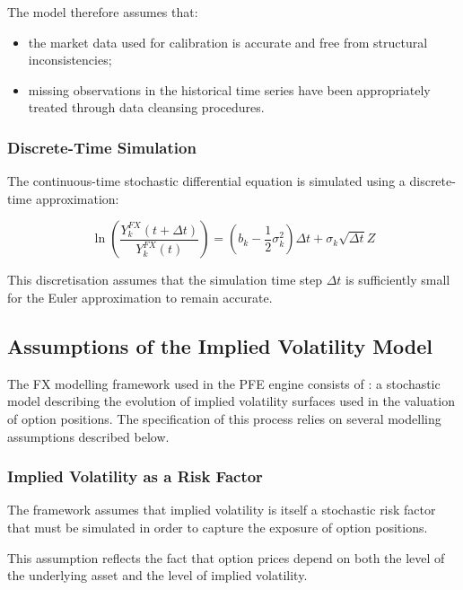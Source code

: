 The model therefore assumes that:

\begin{itemize}
	\item the market data used for calibration is accurate and free from structural inconsistencies;
	\item missing observations in the historical time series have been appropriately treated through data cleansing procedures.
\end{itemize}

\subsubsection{Discrete-Time Simulation}

The continuous-time stochastic differential equation is simulated using a discrete-time approximation:

\begin{equation}
	\ln
	\left(
	\frac{Y_k^{FX}(t+\Delta t)}{Y_k^{FX}(t)}
	\right)
	=
	\left(
	b_k - \frac{1}{2}\sigma_k^2
	\right)\Delta t
	+
	\sigma_k \sqrt{\Delta t} Z
\end{equation}

This discretisation assumes that the simulation time step $\Delta t$ is sufficiently small for the Euler approximation to remain accurate.


\newpage

\subsection{Assumptions of the Implied Volatility Model}

The FX modelling framework used in the PFE engine consists of : 
a stochastic model describing the evolution of implied volatility surfaces used in the valuation of option positions. 
The specification of this process relies on several modelling assumptions described below.


\subsubsection{Implied Volatility as a Risk Factor}

The framework assumes that implied volatility is itself a stochastic risk factor that must be simulated in order to capture the exposure of option positions.

This assumption reflects the fact that option prices depend on both the level of the underlying asset and the level of implied volatility.

